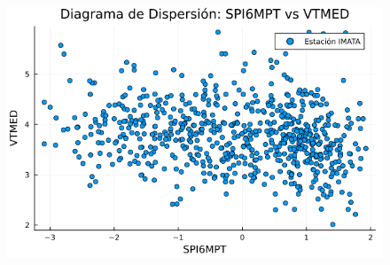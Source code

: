 \begin{figure}[htbp]
\begin{minipage}{0.32\textwidth}
    \includegraphics[width=\linewidth]{Capitulos/Scaterplot/IMATA_SPI6MPT_vs_VTMED.png}
\end{minipage}

\vspace{0.5cm}  %


\end{figure}
